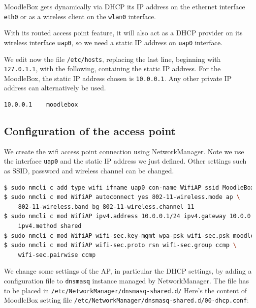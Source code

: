 \documentclass[12pt]{article}
\begin{document}
MoodleBox gets dynamically via DHCP its IP address on the ethernet interface \lstinline{eth0} or as a wireless client on the \lstinline{wlan0} interface.

With its routed access point feature, it will also act as a DHCP provider on its wireless interface \lstinline{uap0}, so we need a static IP address on \lstinline{uap0} interface.

We edit now the file \lstinline{/etc/hosts}, replacing the last line, beginning with \lstinline{127.0.1.1}, with the following, containing the static IP address.
For the MoodleBox, the static IP address chosen is \lstinline{10.0.0.1}.
Any other private IP address can alternatively be used.
\begin{lstlisting}[language=bash]
10.0.0.1	moodlebox
\end{lstlisting}

\subsection{Configuration of the access point}

We create the wifi access point connection using NetworkManager.
Note we use the interface \lstinline{uap0} and the static IP address we just defined.
Other settings such as SSID, password and wireless channel can be changed.
\begin{lstlisting}[language=bash]
$ sudo nmcli c add type wifi ifname uap0 con-name WifiAP ssid MoodleBox
$ sudo nmcli c mod WifiAP autoconnect yes 802-11-wireless.mode ap \
    802-11-wireless.band bg 802-11-wireless.channel 11
$ sudo nmcli c mod WifiAP ipv4.address 10.0.0.1/24 ipv4.gateway 10.0.0.1 \
    ipv4.method shared
$ sudo nmcli c mod WifiAP wifi-sec.key-mgmt wpa-psk wifi-sec.psk moodlebox
$ sudo nmcli c mod WifiAP wifi-sec.proto rsn wifi-sec.group ccmp \
    wifi-sec.pairwise ccmp
\end{lstlisting}

We change some settings of the AP, in particular the DHCP settings, by adding a configuration file to \lstinline{dnsmasq} instance managed by NetworkManager.
The file has to be placed in \lstinline{/etc/NetworkManager/dnsmasq-shared.d/}
Here's the content of MoodleBox setting file \lstinline{/etc/NetworkManager/dnsmasq-shared.d/00-dhcp.conf}:

\end{document}
